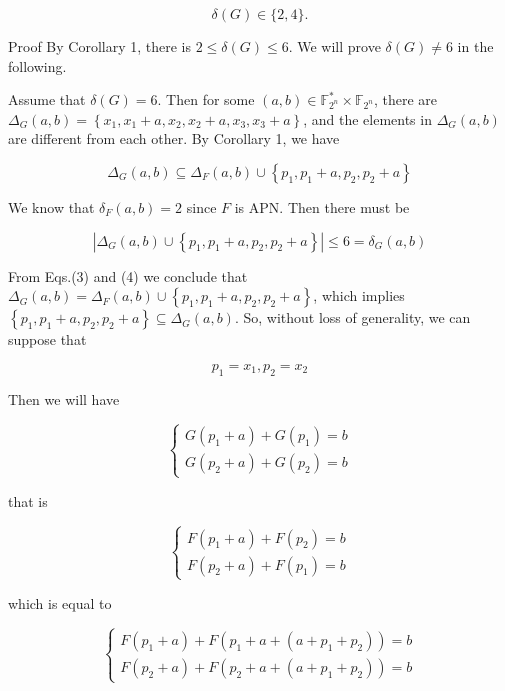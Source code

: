 \documentclass[10pt]{article}
\begin{document}
$$
\delta(G) \in\{2,4\} .
$$

Proof By Corollary 1, there is $2 \leq \delta(G) \leq 6$. We will prove $\delta(G) \neq 6$ in the following.

Assume that $\delta(G)=6$. Then for some $(a, b) \in \mathbb{F}_{2^{n}}^{*} \times \mathbb{F}_{2^{n}}$, there are $\Delta_{G}(a, b)=\left\{x_{1}, x_{1}+a, x_{2}, x_{2}+a, x_{3}, x_{3}+a\right\}$, and the elements in $\Delta_{G}(a, b)$ are different from each other. By Corollary 1, we have


\begin{equation*}
\Delta_{G}(a, b) \subseteq \Delta_{F}(a, b) \cup\left\{p_{1}, p_{1}+a, p_{2}, p_{2}+a\right\} \tag{3}
\end{equation*}


We know that $\delta_{F}(a, b)=2$ since $F$ is APN. Then there must be


\begin{equation*}
\left|\Delta_{G}(a, b) \cup\left\{p_{1}, p_{1}+a, p_{2}, p_{2}+a\right\}\right| \leq 6=\delta_{G}(a, b) \tag{4}
\end{equation*}


From Eqs.(3) and (4) we conclude that $\Delta_{G}(a, b)=\Delta_{F}(a, b) \cup \left\{p_{1}, p_{1}+a, p_{2}, p_{2}+a\right\}$, which implies $\left\{p_{1}, p_{1}+a, p_{2}, p_{2}+a\right\} \subseteq \Delta_{G}(a, b)$. So, without loss of generality, we can suppose that

$$
p_{1}=x_{1}, p_{2}=x_{2}
$$

Then we will have

$$
\left\{\begin{array}{l}
G\left(p_{1}+a\right)+G\left(p_{1}\right)=b \\
G\left(p_{2}+a\right)+G\left(p_{2}\right)=b
\end{array}\right.
$$

that is

$$
\left\{\begin{array}{l}
F\left(p_{1}+a\right)+F\left(p_{2}\right)=b \\
F\left(p_{2}+a\right)+F\left(p_{1}\right)=b
\end{array}\right.
$$

which is equal to

\[
\left\{\begin{array}{l}
F\left(p_{1}+a\right)+F\left(p_{1}+a+\left(a+p_{1}+p_{2}\right)\right)=b  \tag{5}\\
F\left(p_{2}+a\right)+F\left(p_{2}+a+\left(a+p_{1}+p_{2}\right)\right)=b
\end{array}\right.
\]
\end{document}

